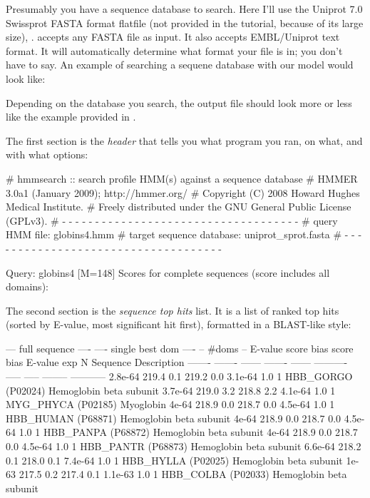 Presumably you have a sequence database to search. Here I'll use the
Uniprot 7.0 Swissprot FASTA format flatfile (not provided in the
tutorial, because of its large size), .
 accepts any FASTA file as input. It also accepts
EMBL/Uniprot text format. It will automatically determine what format
your file is in; you don't have to say. An example of searching a
sequene database with our  model would look like:


Depending on the database you search, the output file
 should look more or less like the example provided
in .

The first section is the \emph{header} that tells you what program you
ran, on what, and with what options:

\begin{sreoutput}
# hmmsearch :: search profile HMM(s) against a sequence database
# HMMER 3.0a1 (January 2009); http://hmmer.org/
# Copyright (C) 2008 Howard Hughes Medical Institute.
# Freely distributed under the GNU General Public License (GPLv3).
# - - - - - - - - - - - - - - - - - - - - - - - - - - - - - - - - - - - -
# query HMM file:                  globins4.hmm
# target sequence database:        uniprot_sprot.fasta
# - - - - - - - - - - - - - - - - - - - - - - - - - - - - - - - - - - - -

Query:       globins4  [M=148]
Scores for complete sequences (score includes all domains):
\end{sreoutput}

The second section is the \emph{ sequence top hits} list. It is a list
of ranked top hits (sorted by E-value, most significant hit first),
formatted in a BLAST-like style:

\begin{sreoutput}
   --- full sequence ----  ---- single best dom ----    -- #doms --
   E-value   score   bias    score   bias    E-value     exp     N  Sequence    Description
   ------- ------- ------  ------- ------ ----------   ----- -----  --------    -----------
   2.8e-64   219.4    0.1    219.2    0.0    3.1e-64     1.0     1  HBB_GORGO   (P02024) Hemoglobin beta subunit
   3.7e-64   219.0    3.2    218.8    2.2    4.1e-64     1.0     1  MYG_PHYCA   (P02185) Myoglobin
     4e-64   218.9    0.0    218.7    0.0    4.5e-64     1.0     1  HBB_HUMAN   (P68871) Hemoglobin beta subunit
     4e-64   218.9    0.0    218.7    0.0    4.5e-64     1.0     1  HBB_PANPA   (P68872) Hemoglobin beta subunit
     4e-64   218.9    0.0    218.7    0.0    4.5e-64     1.0     1  HBB_PANTR   (P68873) Hemoglobin beta subunit
   6.6e-64   218.2    0.1    218.0    0.1    7.4e-64     1.0     1  HBB_HYLLA   (P02025) Hemoglobin beta subunit
     1e-63   217.5    0.2    217.4    0.1    1.1e-63     1.0     1  HBB_COLBA   (P02033) Hemoglobin beta subunit
\end{sreoutput}


